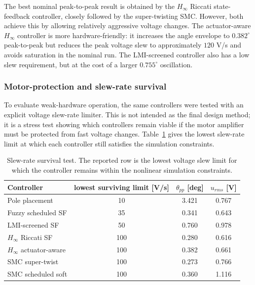 \documentclass[11pt,a4paper]{article}
\begin{document}
The best nominal peak-to-peak result is obtained by the $H_\infty$ Riccati state-feedback controller, closely followed by the super-twisting SMC. However, both achieve this by allowing relatively aggressive voltage changes. The actuator-aware $H_\infty$ controller is more hardware-friendly: it increases the angle envelope to $0.382^\circ$ peak-to-peak but reduces the peak voltage slew to approximately $120$ V/s and avoids saturation in the nominal run. The LMI-screened controller also has a low slew requirement, but at the cost of a larger $0.755^\circ$ oscillation.

\subsubsection{Motor-protection and slew-rate survival}

To evaluate weak-hardware operation, the same controllers were tested with an explicit voltage slew-rate limiter. This is not intended as the final design method; it is a stress test showing which controllers remain viable if the motor amplifier must be protected from fast voltage changes. Table~\ref{table:robust_slew_survival} gives the lowest slew-rate limit at which each controller still satisfies the simulation constraints.

\begin{table}[H]
    \centering
    \begin{tabular}{lccc}
        \hline
        \rowcolor{bluePoli!40}
        Controller & lowest surviving limit [V/s] & $\theta_{pp}$ [deg] & $u_{rms}$ [V] \T\B \\
        \hline\hline
        Pole placement & 10 & 3.421 & 0.767 \T\\
        Fuzzy scheduled SF & 35 & 0.341 & 0.643 \\
        LMI-screened SF & 50 & 0.760 & 0.978 \\
        $H_\infty$ Riccati SF & 100 & 0.280 & 0.616 \\
        $H_\infty$ actuator-aware & 100 & 0.382 & 0.661 \\
        SMC super-twist & 100 & 0.273 & 0.766 \\
        SMC scheduled soft & 100 & 0.360 & 1.116 \B\\
        \hline
    \end{tabular}
    \caption{Slew-rate survival test. The reported row is the lowest voltage slew limit for which the controller remains within the nonlinear simulation constraints.}
    \label{table:robust_slew_survival}
\end{table}
\end{document}
